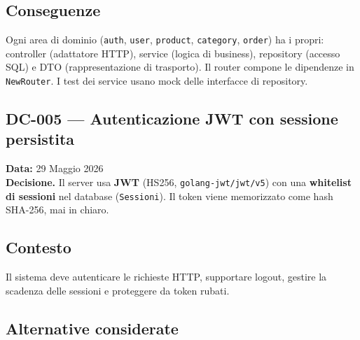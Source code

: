 \documentclass[a4paper,12pt]{article}
\begin{document}
\subsection*{Conseguenze}
Ogni area di dominio (\texttt{auth}, \texttt{user}, \texttt{product}, \texttt{category}, \texttt{order}) ha i propri: controller (adattatore HTTP), service (logica di business), repository (accesso SQL) e DTO (rappresentazione di trasporto). Il router compone le dipendenze in \texttt{NewRouter}. I test dei service usano mock delle interfacce di repository.

\newpage
\begin{decisionbox}
\section*{DC-005 --- Autenticazione JWT con sessione \\ persistita}
\textbf{Data:} 29 Maggio 2026\\
\textbf{Decisione.} Il server usa \textbf{JWT} (HS256, \texttt{golang-jwt/jwt/v5}) con una \textbf{whitelist di sessioni} nel database (\texttt{Sessioni}). Il token viene memorizzato come hash SHA-256, mai in chiaro.
\end{decisionbox}

\subsection*{Contesto}
Il sistema deve autenticare le richieste HTTP, supportare logout, gestire la scadenza delle sessioni e proteggere da token rubati.


\subsection*{Alternative considerate}
\end{document}

